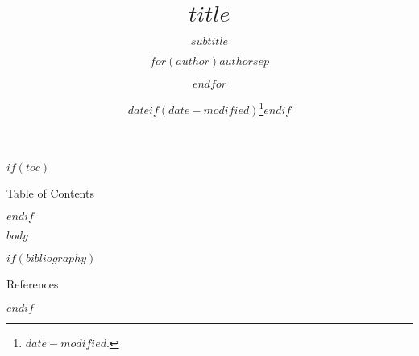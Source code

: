 \documentclass[fontset=fandol,envcountsect]{ctexbeamer}
\title{$title$}
\subtitle{$subtitle$}
\author{$for(author)$$author$$sep$ \and $endfor$}
\institute{$for(institute)$$institute$$sep$ \and $endfor$}
\date{$date$$if(date-modified)$\thanks{\transmodified \space $date-modified$.}$endif$}
\def\transtoc{目录}
\def\transreferences{参考文献}
\def\transtoc{Table of Contents}
\def\transreferences{References}
\theoremstyle{theorem}
\theoremstyle{example}
\theoremstyle{remark}
\theoremstyle{theorem}
\theoremstyle{example}
\theoremstyle{remark}
\begin{document}
\frame{\titlepage}

$if(toc)$
\begin{frame}{\transtoc}
  \tableofcontents
\end{frame}
$endif$

$body$

$if(bibliography)$
\begin{frame}[allowframebreaks]{\transreferences}
    \printbibliography[heading=none]
\end{frame}
$endif$
\end{document}
